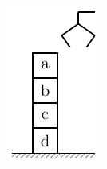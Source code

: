 \documentclass[default]{beamer}
\begin{document}
\begin{frame}
\begin{columns}
\begin{column}{0.3\textwidth}
				\includegraphics[page=3,width=\textwidth]{plan/block_world}
			\end{column}
		\end{columns}
	\end{frame}
				
\end{document}
